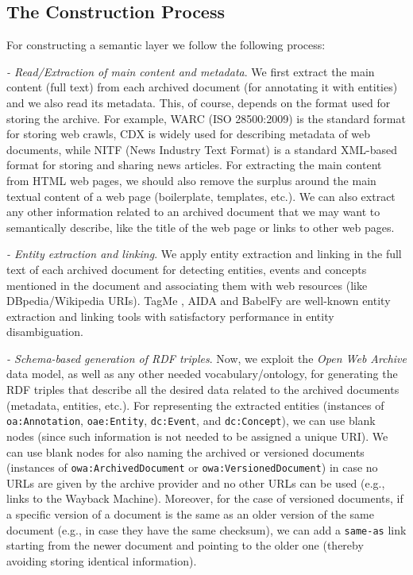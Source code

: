\documentclass{libtex/sig-alternate-05-2015}
\begin{document}
\subsection{The Construction Process}
\label{subsec:theprocess}

For constructing a semantic layer we follow
the following process:

\vspace{0.5mm} \noindent
{\em - Read/Extraction of main content and metadata}.
We first extract the main content (full text) from
each archived document (for annotating it with entities) and
we also read its metadata.
This, of course, depends on the format used for
storing the archive. For example,
WARC (ISO 28500:2009) is the standard format for storing web crawls, %
CDX is widely used for describing metadata of web documents,
while NITF (News Industry Text Format) is a standard %
XML-based format for storing and sharing news articles.
For extracting the main content from HTML web pages,
we should also remove the surplus
around the main textual content of a web page (boilerplate, templates, etc.).
We can also extract any other information related to an archived document
that we may want to semantically describe, like the title of the web page or
links to other web pages.

\vspace{0.5mm} \noindent
{\em - Entity extraction and linking}.
We apply entity extraction and linking in the full text of each
archived document for detecting entities, events and concepts
mentioned in the document and associating them with web resources
(like DBpedia/Wikipedia URIs).
TagMe \cite{ferragina2010tagme},
AIDA \cite{hoffart2011robust} and
BabelFy \cite{moro2014entity} are
well-known entity extraction and linking tools with
 satisfactory performance in entity disambiguation.

\vspace{0.5mm} \noindent
{\em - Schema-based generation of RDF triples}.
Now, we exploit the {\em Open Web Archive} data model, as well
as any other needed vo\-ca\-bu\-la\-ry/onto\-lo\-gy, for
generating the RDF triples that
describe all the desired data related
to the archived documents (metadata, entities, etc.).
For representing the extracted entities (instances of {\tt oa:Annotation},
 {\tt oae:\-Entity}, {\tt dc:\-Event}, and {\tt dc:\-Concept}),
we can use blank nodes \cite{beckett2004rdf}
(since such information is not needed to be assigned a unique URI).
We can use blank nodes for also naming the
archived or versioned documents (instances of {\tt owa:Archi\-ved\-Do\-cu\-ment} or
{\tt owa:\-Ve\-rsionedDo\-cu\-ment}) in case no URLs are given by the archive provider
and no other URLs can be used (e.g., links to the Wayback Machine).
Moreover,
for the case of versioned documents,
if a specific version of a document is the
same as an older version of the same document
(e.g., in case they have the same checksum),
we can add a {\tt same-as} link
starting from the newer document and pointing to
the older one (thereby avoiding storing identical information).
\end{document}
